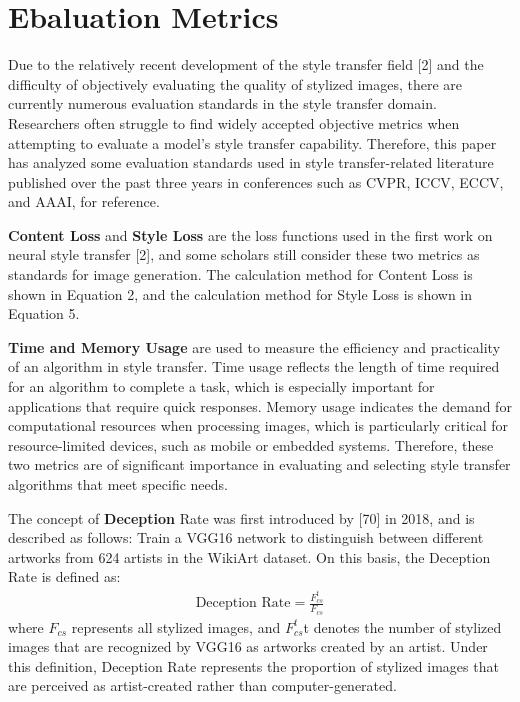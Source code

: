 \section{Ebaluation Metrics}

Due to the relatively recent development of the style transfer field [2] and the difficulty of objectively evaluating the quality of stylized images, there are currently numerous evaluation standards in the style transfer domain. Researchers often struggle to find widely accepted objective metrics when attempting to evaluate a model's style transfer capability. Therefore, this paper has analyzed some evaluation standards used in style transfer-related literature published over the past three years in conferences such as CVPR, ICCV, ECCV, and AAAI, for reference.

\textbf{Content Loss} and \textbf{Style Loss} are the loss functions used in the first work on neural style transfer [2], and some scholars still consider these two metrics as standards for image generation. The calculation method for Content Loss is shown in Equation 2, and the calculation method for Style Loss is shown in Equation 5.

\textbf{Time and Memory Usage} are used to measure the efficiency and practicality of an algorithm in style transfer. Time usage reflects the length of time required for an algorithm to complete a task, which is especially important for applications that require quick responses. Memory usage indicates the demand for computational resources when processing images, which is particularly critical for resource-limited devices, such as mobile or embedded systems. Therefore, these two metrics are of significant importance in evaluating and selecting style transfer algorithms that meet specific needs.

The concept of \textbf{Deception} Rate was first introduced by [70] in 2018, and is described as follows: Train a VGG16 network to distinguish between different artworks from 624 artists in the WikiArt dataset. On this basis, the Deception Rate is defined as:
\begin{equation}
    \begin{aligned}
        \text{Deception Rate} = \frac{F_{cs}^t}{F_{cs}}
    \end{aligned}
\end{equation}
where $F_{cs}$ represents all stylized images, and  $F_{cs}^t$t denotes the number of stylized images that are recognized by VGG16 as artworks created by an artist. Under this definition, Deception Rate represents the proportion of stylized images that are perceived as artist-created rather than computer-generated.

